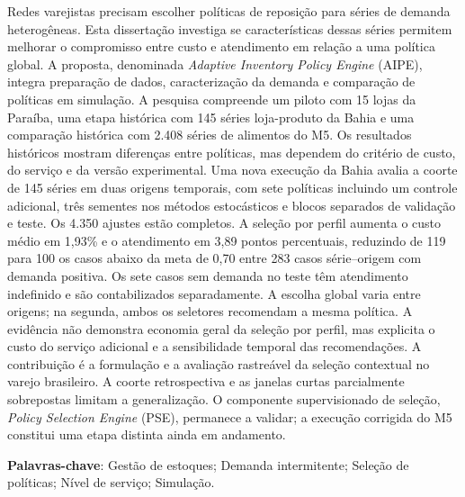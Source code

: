 Redes varejistas precisam escolher políticas de reposição para séries de demanda heterogêneas. Esta dissertação investiga se características dessas séries permitem melhorar o compromisso entre custo e atendimento em relação a uma política global. A proposta, denominada \textit{Adaptive Inventory Policy Engine} (AIPE), integra preparação de dados, caracterização da demanda e comparação de políticas em simulação. A pesquisa compreende um piloto com 15 lojas da Paraíba, uma etapa histórica com 145 séries loja-produto da Bahia e uma comparação histórica com 2.408 séries de alimentos do M5. Os resultados históricos mostram diferenças entre políticas, mas dependem do critério de custo, do serviço e da versão experimental. Uma nova execução da Bahia avalia a coorte de 145 séries em duas origens temporais, com sete políticas incluindo um controle adicional, três sementes nos métodos estocásticos e blocos separados de validação e teste. Os 4.350 ajustes estão completos. A seleção por perfil aumenta o custo médio em 1,93\% e o atendimento em 3,89 pontos percentuais, reduzindo de 119 para 100 os casos abaixo da meta de 0,70 entre 283 casos série--origem com demanda positiva. Os sete casos sem demanda no teste têm atendimento indefinido e são contabilizados separadamente. A escolha global varia entre origens; na segunda, ambos os seletores recomendam a mesma política. A evidência não demonstra economia geral da seleção por perfil, mas explicita o custo do serviço adicional e a sensibilidade temporal das recomendações. A contribuição é a formulação e a avaliação rastreável da seleção contextual no varejo brasileiro. A coorte retrospectiva e as janelas curtas parcialmente sobrepostas limitam a generalização. O componente supervisionado de seleção, \textit{Policy Selection Engine} (PSE), permanece a validar; a execução corrigida do M5 constitui uma etapa distinta ainda em andamento.

\vspace{2em}
\textbf{Palavras-chave}: Gestão de estoques; Demanda intermitente; Seleção de políticas; Nível de serviço; Simulação.
